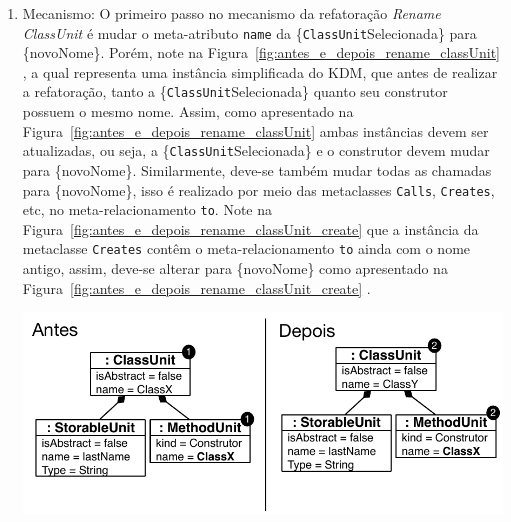 \begin{enumerate}
\begin{enumerate}
\begin{itemize}
			    \end{itemize}
			\item Mecanismo: O primeiro passo no mecanismo da refatoração \textit{Rename ClassUnit} é mudar o meta-atributo \texttt{name} da \{\texttt{ClassUnit}Selecionada\} para \{novoNome\}. Porém, note na Figura~\ref{fig:antes_e_depois_rename_classUnit} , a qual representa uma instância simplificada do KDM, que antes de realizar a refatoração, tanto a \{\texttt{ClassUnit}Selecionada\} quanto seu construtor possuem o mesmo nome. Assim, como apresentado na Figura~\ref{fig:antes_e_depois_rename_classUnit}  ambas instâncias devem ser atualizadas, ou seja, a \{\texttt{ClassUnit}Selecionada\} e o construtor devem mudar para \{novoNome\}. Similarmente, deve-se também mudar todas as chamadas para \{novoNome\}, isso é realizado por meio das metaclasses \texttt{Calls}, \texttt{Creates}, etc, no meta-relacionamento \texttt{to}. Note na Figura~\ref{fig:antes_e_depois_rename_classUnit_create}  que a instância da metaclasse \texttt{Creates} contêm o meta-relacionamento \texttt{to} ainda com o nome antigo, assim, deve-se alterar para \{novoNome\} como apresentado na Figura~\ref{fig:antes_e_depois_rename_classUnit_create} .
			\begin{minipage}{.90\textwidth}
	\vspace*{\fill}
  \centering
	\includegraphics[scale=0.6]{images/antes_e_depois_rename_classUnit.pdf}
	\fautor
	\label{fig:antes_e_depois_rename_classUnit}

\end{minipage}
\end{enumerate}
\end{enumerate}
